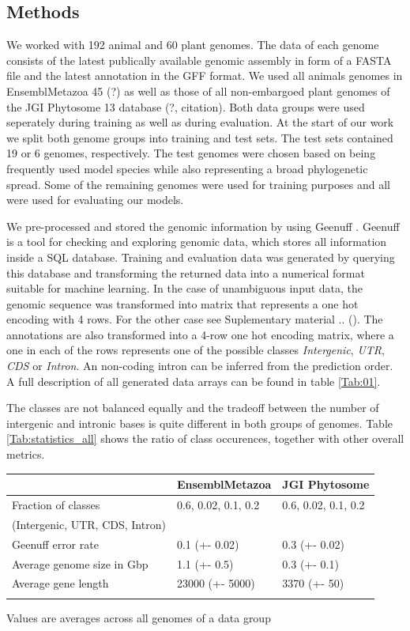 \documentclass{bioinfo}
\begin{document}
\begin{methods}
\section{Methods}
We worked with 192 animal and 60 plant genomes. The data of each genome consists of the latest publically available genomic assembly in form of a FASTA file and the latest annotation in the GFF format. We used all animals genomes in EnsemblMetazoa 45 (?) \citealp{Howe19} as well as those of all non-embargoed plant genomes of the JGI Phytosome 13 database (?, citation). Both data groups were used seperately during training as well as during evaluation. At the start of our work we split both genome groups into training and test sets. The test sets contained 19 or 6 genomes, respectively. The test genomes were chosen based on being frequently used model species while also representing a broad phylogenetic spread. Some of the remaining genomes were used for training purposes and all were used for evaluating our models. 

We pre-processed and stored the genomic information by using Geenuff \citealp{Denton19}. Geenuff is a tool for checking and exploring genomic data, which stores all information inside a SQL database. Training and evaluation data was generated by querying this database and transforming the returned data into a numerical format suitable for machine learning. In the case of unambiguous input data, the genomic sequence was transformed into matrix that represents a one hot encoding with 4 rows. For the other case see Suplementary material .. (). The annotations are also transformed into a 4-row one hot encoding matrix, where a one in each of the rows represents one of the possible classes {\it Intergenic}, {\it UTR}, {\it CDS} or {\it Intron}. An non-coding intron can be inferred from the prediction order. A full description of all generated data arrays can be found in table \ref{Tab:01}.

The classes are not balanced equally and the tradeoff between the number of intergenic and intronic bases is quite different in both groups of genomes. Table \ref{Tab:statistics_all} shows the ratio of class occurences, together with other overall metrics.

\begin{table}[!t]
 {
\begin{tabular}{@{}lll@{}}
\toprule & EnsemblMetazoa & JGI Phytosome\\
\midrule
Fraction of classes  & 0.6, 0.02, 0.1, 0.2 & 0.6, 0.02, 0.1, 0.2 \\
(Intergenic, UTR, CDS, Intron) & & \\
Geenuff error rate & 0.1 (+- 0.02) & 0.3 (+- 0.02) \\
Average genome size in Gbp& 1.1 (+- 0.5) & 0.3 (+- 0.1) \\
Average gene length & 23000 (+- 5000) & 3370 (+- 50) \\
\botrule
\end{tabular}}{Values are averages across all genomes of a data group}
\end{table}


\end{methods}
\end{document}
